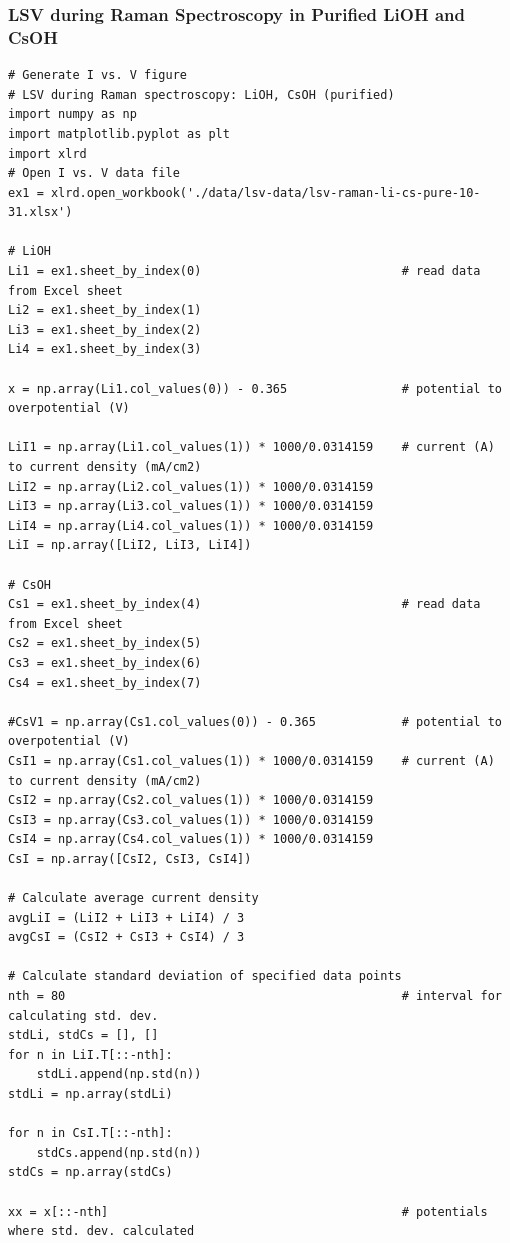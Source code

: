 \documentclass[journal=jpccck,manuscript=suppinfo,email=true]{achemso}
\begin{document}
\subsubsection{LSV during Raman Spectroscopy in Purified LiOH and CsOH}
\label{sec-6-1-7}
\begin{verbatim}
# Generate I vs. V figure
# LSV during Raman spectroscopy: LiOH, CsOH (purified)
import numpy as np
import matplotlib.pyplot as plt
import xlrd
# Open I vs. V data file
ex1 = xlrd.open_workbook('./data/lsv-data/lsv-raman-li-cs-pure-10-31.xlsx')

# LiOH
Li1 = ex1.sheet_by_index(0)                            # read data from Excel sheet
Li2 = ex1.sheet_by_index(1)
Li3 = ex1.sheet_by_index(2)
Li4 = ex1.sheet_by_index(3)

x = np.array(Li1.col_values(0)) - 0.365                # potential to overpotential (V)

LiI1 = np.array(Li1.col_values(1)) * 1000/0.0314159    # current (A) to current density (mA/cm2)
LiI2 = np.array(Li2.col_values(1)) * 1000/0.0314159
LiI3 = np.array(Li3.col_values(1)) * 1000/0.0314159
LiI4 = np.array(Li4.col_values(1)) * 1000/0.0314159
LiI = np.array([LiI2, LiI3, LiI4])

# CsOH
Cs1 = ex1.sheet_by_index(4)                            # read data from Excel sheet
Cs2 = ex1.sheet_by_index(5)
Cs3 = ex1.sheet_by_index(6)
Cs4 = ex1.sheet_by_index(7)

#CsV1 = np.array(Cs1.col_values(0)) - 0.365            # potential to overpotential (V)
CsI1 = np.array(Cs1.col_values(1)) * 1000/0.0314159    # current (A) to current density (mA/cm2)
CsI2 = np.array(Cs2.col_values(1)) * 1000/0.0314159
CsI3 = np.array(Cs3.col_values(1)) * 1000/0.0314159
CsI4 = np.array(Cs4.col_values(1)) * 1000/0.0314159
CsI = np.array([CsI2, CsI3, CsI4])

# Calculate average current density
avgLiI = (LiI2 + LiI3 + LiI4) / 3
avgCsI = (CsI2 + CsI3 + CsI4) / 3

# Calculate standard deviation of specified data points
nth = 80                                               # interval for calculating std. dev.
stdLi, stdCs = [], []
for n in LiI.T[::-nth]:
    stdLi.append(np.std(n))
stdLi = np.array(stdLi)

for n in CsI.T[::-nth]:
    stdCs.append(np.std(n))
stdCs = np.array(stdCs)

xx = x[::-nth]                                         # potentials where std. dev. calculated


\end{verbatim}
\end{document}
